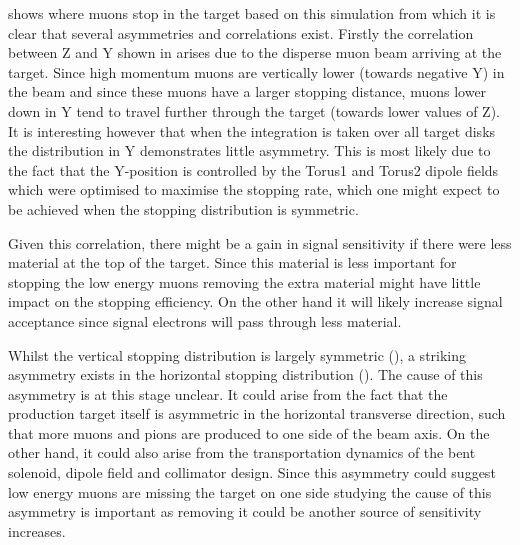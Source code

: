  shows where muons stop in the target based on this simulation from which it is clear that several asymmetries and correlations exist.
Firstly the correlation between Z and Y shown in  arises due to the disperse muon beam arriving at the target. 
Since high momentum muons are vertically lower (towards negative Y) in the beam and since these muons have a larger stopping distance, muons lower down in Y tend to travel further through the target (towards lower values of Z).
It is interesting however that when the integration is taken over all target disks the distribution in Y demonstrates little asymmetry. 
This is most likely due to the fact that the Y-position is controlled by the Torus1 and Torus2 dipole fields which were optimised to maximise the stopping rate, which one might expect to be achieved when the stopping distribution is symmetric.

\FigSensMuStopsTwoD
Given this correlation, there might be a gain in signal sensitivity if there were less material at the top of the target.
Since this material is less important for stopping the low energy muons removing the extra material might have little impact on the stopping efficiency.
On the other hand it will likely increase signal acceptance since signal electrons will pass through less material.

Whilst the vertical stopping distribution is largely symmetric (),
a striking asymmetry exists in the horizontal stopping distribution ().
The cause of this asymmetry is at this stage unclear.
It could arise from the fact that the production target itself is asymmetric in the horizontal transverse direction, such that more muons and pions are produced to one side of the beam axis.
On the other hand, it could also arise from the transportation dynamics of the bent solenoid, dipole field and collimator design. 
Since this asymmetry could suggest low energy muons are missing the target on one side studying the cause of this asymmetry is important as removing it could be another source of sensitivity increases.


